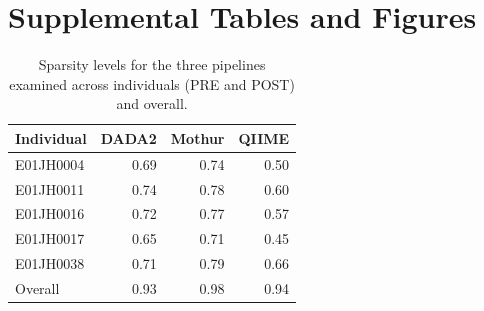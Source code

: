 \documentclass[12pt]{article}
\begin{document}
\cleardoublepage


 

\cleardoublepage

\section*{Supplemental Tables and Figures}
\clearpage

\begin{table}
\caption{\label{tab:sparsity}Sparsity levels for the three pipelines examined across individuals (PRE and POST) and overall.}
\centering
\begin{tabular}[t]{lrrr}
\toprule
Individual   & DADA2 & Mothur & QIIME \\
\midrule
E01JH0004 & 0.69  & 0.74   & 0.50  \\
E01JH0011 & 0.74  & 0.78   & 0.60  \\
E01JH0016 & 0.72  & 0.77   & 0.57  \\
E01JH0017 & 0.65  & 0.71   & 0.45  \\
E01JH0038 & 0.71  & 0.79   & 0.66  \\
\midrule
Overall   & 0.93  & 0.98   & 0.94  \\
\bottomrule
\end{tabular}
\end{table}

\begin{table}
\caption{\label{tab:relAbuErrorTbl}Maximum feature-level error rate bias (median error rate) and variance (robust COV) by pipeline and individual.}
\centering
{}
\end{table}
\end{document}
